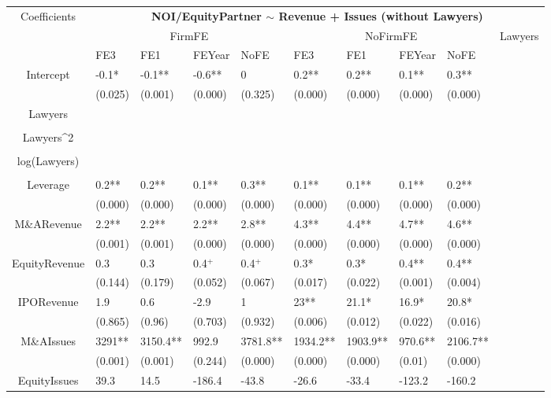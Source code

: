 \documentclass{article}
\begin{document}
\begin{table}[H]
\centering
\begin{tabular}{|clllllllll|}
\hline
\multirow{3}{*}{Coefficients} & \multicolumn{9}{c|}{\textbf{NOI/EquityPartner $\sim$ Revenue + Issues (without Lawyers)}} \\
\cline{2-10}
& \multicolumn{4}{c}{FirmFE} & \multicolumn{4}{c}{NoFirmFE} & \multirow{2}{*}{Lawyers} \\
\cline{2-9}
& FE3 & FE1 & FEYear & NoFE & FE3 & FE1 & FEYear & NoFE &  \\
\hline
 
Intercept & -0.1* & -0.1** & -0.6** & 0 & 0.2** & 0.2** & 0.1** & 0.3** & \\ 
   & (0.025) & (0.001) & (0.000) & (0.325) & (0.000) & (0.000) & (0.000) & (0.000) & \\ 
  Lawyers &  &  &  &  &  &  &  &  & \\ 
   &  &  &  &  &  &  &  &  & \\ 
  Lawyers^2 &  &  &  &  &  &  &  &  & \\ 
   &  &  &  &  &  &  &  &  & \\ 
  log(Lawyers) &  &  &  &  &  &  &  &  & \\ 
   &  &  &  &  &  &  &  &  & \\ 
  Leverage & 0.2** & 0.2** & 0.1** & 0.3** & 0.1** & 0.1** & 0.1** & 0.2** & \\ 
   & (0.000) & (0.000) & (0.000) & (0.000) & (0.000) & (0.000) & (0.000) & (0.000) & \\ 
  M\&ARevenue & 2.2** & 2.2** & 2.2** & 2.8** & 4.3** & 4.4** & 4.7** & 4.6** & \\ 
   & (0.001) & (0.001) & (0.000) & (0.000) & (0.000) & (0.000) & (0.000) & (0.000) & \\ 
  EquityRevenue & 0.3 & 0.3 & 0.4$^{+}$ & 0.4$^{+}$ & 0.3* & 0.3* & 0.4** & 0.4** & \\ 
   & (0.144) & (0.179) & (0.052) & (0.067) & (0.017) & (0.022) & (0.001) & (0.004) & \\ 
  IPORevenue & 1.9 & 0.6 & -2.9 & 1 & 23** & 21.1* & 16.9* & 20.8* & \\ 
   & (0.865) & (0.96) & (0.703) & (0.932) & (0.006) & (0.012) & (0.022) & (0.016) & \\ 
  M\&AIssues & 3291** & 3150.4** & 992.9 & 3781.8** & 1934.2** & 1903.9** & 970.6** & 2106.7** & \\ 
   & (0.001) & (0.001) & (0.244) & (0.000) & (0.000) & (0.000) & (0.01) & (0.000) & \\ 
  EquityIssues & 39.3 & 14.5 & -186.4 & -43.8 & -26.6 & -33.4 & -123.2 & -160.2 & \\ 

\end{tabular}
\end{table}
\end{document}
